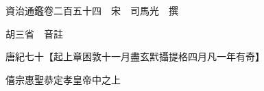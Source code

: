 










 


 
 


 

  
  
  
  
  





  
  
  
  
  
 
  

  

  
  
  



  

 
 

  
   




  

  
  


  　　資治通鑑卷二百五十四　宋　司馬光　撰

　　胡三省　音註

　　唐紀七十【起上章困敦十一月盡玄黓攝提格四月凡一年有奇】

　　僖宗惠聖恭定孝皇帝中之上

